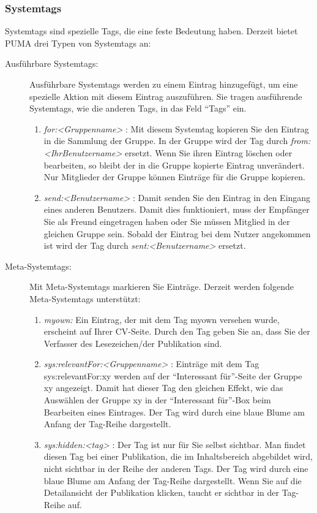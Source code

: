 \subsubsection*{Systemtags}
Systemtags \label{systemtag} sind spezielle Tags, die eine feste Bedeutung haben. Derzeit bietet PUMA drei Typen von Systemtags an:
\begin{description}
\item[Ausführbare Systemtags:]
Ausführbare Systemtags werden zu einem Eintrag hinzugefügt, um eine spezielle Aktion mit diesem Eintrag auszuführen. Sie tragen ausführende Systemtags, wie die anderen Tags, in das Feld \enquote{Tags} ein. 
\begin{enumerate}
    \item \textit{for:<Gruppenname>} : Mit diesem Systemtag kopieren Sie den Eintrag in die Sammlung der Gruppe. In der Gruppe wird der Tag durch \textit{from:<IhrBenutzername>} ersetzt. Wenn Sie ihren Eintrag löschen oder bearbeiten, so bleibt der in die Gruppe kopierte Eintrag unverändert. Nur Mitglieder der Gruppe können Einträge für die Gruppe kopieren.
    \item \textit{send:<Benutzername>} : Damit senden Sie den Eintrag in den Eingang eines anderen Benutzers. Damit dies funktioniert, muss der Empfänger Sie als Freund eingetragen haben oder Sie müssen Mitglied in der gleichen Gruppe sein. Sobald der Eintrag bei dem Nutzer angekommen ist wird der Tag durch \textit{sent:<Benutzername>} ersetzt.
\end{enumerate}
\item[Meta-Systemtags:]  
Mit Meta-Systemtags markieren Sie Einträge. Derzeit werden folgende Meta-Systemtags unterstützt:
\begin{enumerate}
    \item \textit{myown:} Ein Eintrag, der mit dem Tag myown versehen wurde, erscheint auf Ihrer CV-Seite. Durch den Tag geben Sie an, dass Sie der Verfasser des Lesezeichen/der Publikation sind.
    \item \textit{sys:relevantFor:<Gruppenname>} : Einträge mit dem Tag sys:relevantFor:xy werden auf der \enquote{Interessant für}-Seite der Gruppe xy angezeigt. Damit hat dieser Tag den gleichen Effekt, wie das  Auswählen der Gruppe xy in der \enquote{Interessant für}-Box beim Bearbeiten eines Eintrages. Der Tag wird durch eine blaue Blume am Anfang der Tag-Reihe dargestellt. 
    \item \textit{sys:hidden:<tag>} : Der Tag ist nur für Sie selbst sichtbar. Man findet diesen Tag bei einer Publikation, die im Inhaltsbereich abgebildet wird, nicht sichtbar in der Reihe der anderen Tags. Der Tag wird durch eine blaue Blume am Anfang der Tag-Reihe dargestellt. Wenn Sie auf die Detailansicht der Publikation klicken, taucht er sichtbar in der Tag-Reihe auf.

\end{enumerate}
\end{description}
